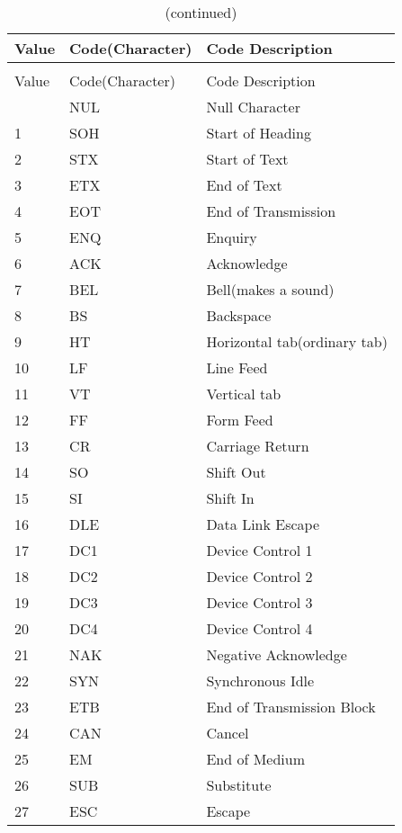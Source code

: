 \begin{description}
    \begin{longtable}{lll}
      \caption{The ASCII table} \\
      \toprule
      Value & Code(Character) & Code Description \\
      \midrule
      \endfirsthead
      \caption[]{(continued)}\\
      \toprule
      Value & Code(Character) & Code Description \\
      \midrule
      \endhead
      \bottomrule
      \endfoot
      \bottomrule
      \endlastfoot
      0 & NUL & Null Character \\
      1 & SOH & Start of Heading \\
      2 & STX & Start of Text \\
      3 & ETX & End of Text \\
      4 & EOT & End of Transmission \\
      5 & ENQ & Enquiry \\
      6 & ACK & Acknowledge \\
      7 & BEL & Bell(makes a sound) \\
      8 & BS & Backspace \\
      9 & HT & Horizontal tab(ordinary tab) \\
      10 & LF & Line Feed \\
      11 & VT & Vertical tab \\
      12 & FF & Form Feed \\
      13 & CR & Carriage Return \\
      14 & SO & Shift Out \\
      15 & SI & Shift In \\
      16 & DLE & Data Link Escape \\
      17 & DC1 & Device Control 1 \\
      18 & DC2 & Device Control 2 \\
      19 & DC3 & Device Control 3 \\
      20 & DC4 & Device Control 4\\
      21 & NAK & Negative Acknowledge \\
      22 & SYN & Synchronous Idle \\
      23 & ETB & End of Transmission Block \\
      24 & CAN & Cancel \\
      25 & EM & End of Medium \\
      26 & SUB & Substitute \\
      27 & ESC & Escape \\

\end{longtable}
\end{description}
